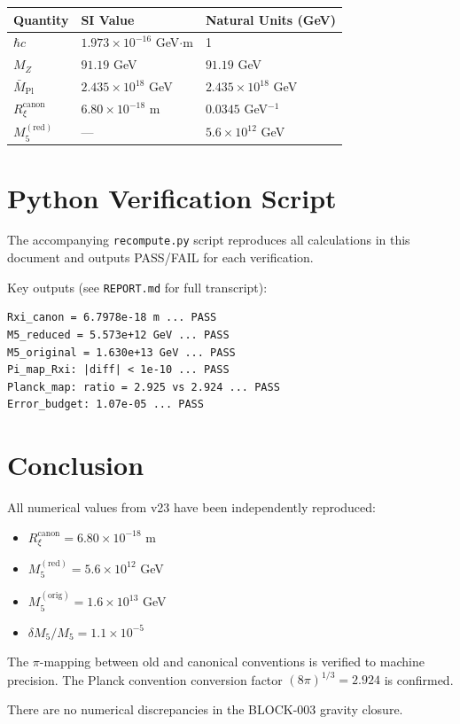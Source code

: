\documentclass[11pt,a4paper]{article}
\newcommand{\Rxi}{R_\xi}
\newcommand{\Mplbar}{\bar{M}_{\mathrm{Pl}}}
\newcommand{\Mfive}{M_5}
\newcommand{\MZ}{M_Z}
\newcommand{\hbarc}{\hbar c}
\begin{document}
\begin{center}
\begin{tabular}{lll}
\toprule
\textbf{Quantity} & \textbf{SI Value} & \textbf{Natural Units (GeV)} \\
\midrule
$\hbarc$ & $1.973 \times 10^{-16}$ GeV$\cdot$m & 1 \\
$\MZ$ & $91.19$ GeV & $91.19$ GeV \\
$\Mplbar$ & $2.435 \times 10^{18}$ GeV & $2.435 \times 10^{18}$ GeV \\
$\Rxi^{\mathrm{canon}}$ & $6.80 \times 10^{-18}$ m & $0.0345$ GeV$^{-1}$ \\
$\Mfive^{\mathrm{(red)}}$ & --- & $5.6 \times 10^{12}$ GeV \\
\bottomrule
\end{tabular}
\end{center}

\section{Python Verification Script}

The accompanying \texttt{recompute.py} script reproduces all calculations in this
document and outputs PASS/FAIL for each verification.

Key outputs (see \texttt{REPORT.md} for full transcript):
\begin{verbatim}
Rxi_canon = 6.7978e-18 m ... PASS
M5_reduced = 5.573e+12 GeV ... PASS
M5_original = 1.630e+13 GeV ... PASS
Pi_map_Rxi: |diff| < 1e-10 ... PASS
Planck_map: ratio = 2.925 vs 2.924 ... PASS
Error_budget: 1.07e-05 ... PASS
\end{verbatim}

\section{Conclusion}

All numerical values from v23 have been independently reproduced:
\begin{itemize}
\item $\Rxi^{\mathrm{canon}} = 6.80 \times 10^{-18}$ m
\item $\Mfive^{\mathrm{(red)}} = 5.6 \times 10^{12}$ GeV
\item $\Mfive^{\mathrm{(orig)}} = 1.6 \times 10^{13}$ GeV
\item $\delta\Mfive/\Mfive = 1.1 \times 10^{-5}$
\end{itemize}

The $\pi$-mapping between old and canonical conventions is verified to machine precision.
The Planck convention conversion factor $(8\pi)^{1/3} = 2.924$ is confirmed.

There are no numerical discrepancies in the BLOCK-003 gravity closure.
\end{document}
